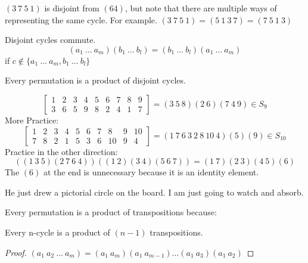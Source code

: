 \documentclass[11pt]{scrartcl}
\begin{document}
\begin{example}
  $(3 \ 7 \ 5 \ 1)$ is disjoint from $(64)$, but note that there are multiple ways of representing the same cycle. \newline
  For example. $(3 \ 7 \ 5 \ 1) = (5 \ 1 \ 3 \ 7) = (7 \ 5 \ 1 \ 3)$
\end{example}

\begin{theorem}
  Disjoint cycles commute.
  $$ (a_1 \ \dots \ a_m)(b_1 \ \dots \ b_l) = (b_1 \ \dots \ b_l)(a_1 \ \dots \ a_m) $$
  if $c \notin \{a_1 \ \dots \ a_m, b_1 \ \dots \ b_l\}$
\end{theorem}

\begin{theorem}
  Every permutation is a product of disjoint cycles.
\end{theorem}

\begin{example}
  \[
    \begin{bmatrix}
      1 & 2 & 3 & 4 & 5 & 6 & 7 & 8 & 9 \\
      3 & 6 & 5 & 9 & 8 & 2 & 4 & 1 & 7 
    \end{bmatrix}
    =
    (3 \ 5 \ 8)(2 \ 6)(7 \ 4 \ 9)
    \in S_9
  \]
  More Practice:
  \[
    \begin{bmatrix}
      1 & 2 & 3 & 4 & 5 & 6 & 7 & 8 & 9 & 10 \\
      7 & 8 & 2 & 1 & 5 & 3 & 6 & 10 & 9 & 4
    \end{bmatrix}
    =
    (1 \ 7 \ 6 \ 3 \ 2 \ 8 \ 10 \ 4)(5)(9)
    \in S_{10}
  \]
  Practice in the other direction:
  \[
    ((1 \ 3 \ 5)(2 \ 7 \ 6 \ 4))((1\ 2)(3 \ 4)(5 \ 6 \ 7)) = (1 \ 7)(2 \ 3)(4 \ 5)(6)
  \]
  The $(6)$ at the end is unnecessary because it is an identity element.
\end{example}

He just drew a pictorial circle on the board. I am just going to watch and absorb.

\begin{theorem}
  Every permutation is a product of transpositions because:
  \begin{theorem}
    Every n-cycle is a product of $(n - 1)$ transpositions.
  \end{theorem}
  \begin{proof}
    $(a_1 \ a_2 \ \dots \ a_m) = (a_1 \ a_m)(a_1 \ a_{m - 1}) \dots (a_1 \ a_3)(a_1 \ a_2)$
  \end{proof}
\end{theorem}
\end{document}
